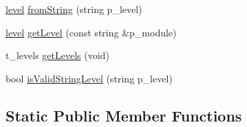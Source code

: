 \begin{DoxyCompactItemize}
\item 
\hyperlink{classxtd_1_1logger_a250ce2f143da181d7149a1556da2a6f1}{level} \hyperlink{classxtd_1_1logger_a88420216bbafe0a36bbd25080ac14567}{from\-String} (string p\-\_\-level)
\item 
\hyperlink{classxtd_1_1logger_a250ce2f143da181d7149a1556da2a6f1}{level} \hyperlink{classxtd_1_1logger_a4cb9dd27ead213c0a9f3d85d80e9a7b4}{get\-Level} (const string \&p\-\_\-module)
\item 
t\-\_\-levels \hyperlink{classxtd_1_1logger_a8b22d69269de5f4269fbbf43fe6f9b53}{get\-Levels} (void)
\item 
bool \hyperlink{classxtd_1_1logger_aaca2ec5d979b7f57c2060ecaac2715ec}{is\-Valid\-String\-Level} (string p\-\_\-level)
\end{DoxyCompactItemize}
\subsection*{Static Public Member Functions}
